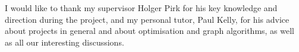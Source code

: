 \cleardoublepage


\begin{acknowledgements}

I would like to thank my supervisor Holger Pirk for his key knowledge and direction during the project, and my personal tutor, Paul Kelly, for his advice about projects in general and about optimisation and graph algorithms, as well as all our interesting discussions.

\end{acknowledgements}
